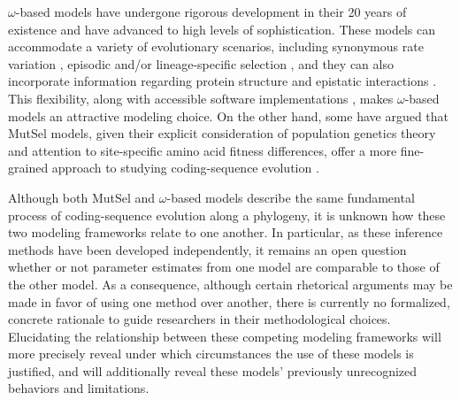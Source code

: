 \documentclass[11pt]{article}
\begin{document}
$\omega$-based models have undergone rigorous development in their 20 years of existence and have advanced to high levels of sophistication. These models can accommodate a variety of evolutionary scenarios, including synonymous rate variation \cite{MuseGaut1994,KosakovskyPondMuse2005}, episodic \cite{KosakovskyPondetal2011,MEME} and/or lineage-specific selection \cite{YangNielsen2002,Zhangetal2005,KosakovskyPondFrost2005a}, and they can also incorporate information regarding protein structure and epistatic interactions \cite{Robinsonetal2003,Thorneetal2007,Rodrigueetal2009,Scherreretal2012,MeyerWilke2012}. This flexibility, along with accessible software implementations \cite{KosakovskyPondetal2005,Yang2007,Delport2010}, makes $\omega$-based models an attractive modeling choice. On the other hand, some have argued that MutSel models, given their explicit consideration of population genetics theory and attention to site-specific amino acid fitness differences, offer a more fine-grained approach to studying coding-sequence evolution \cite{HalpernBruno1998,Rodrigueetal2010,Tamurietal2012,Thorne2012}. 
		
Although both MutSel and $\omega$-based models describe the same fundamental process of coding-sequence evolution along a phylogeny, it is unknown how these two modeling frameworks relate to one another. In particular, as these inference methods have been developed independently, it remains an open question whether or not parameter estimates from one model are comparable to those of the other model. As a consequence, although certain rhetorical arguments may be made in favor of using one method over another, there is currently no formalized, concrete rationale to guide researchers in their methodological choices. Elucidating the relationship between these competing modeling frameworks will more precisely reveal under which circumstances the use of these models is justified, and will additionally reveal these models' previously unrecognized behaviors and limitations.
		
\end{document}
